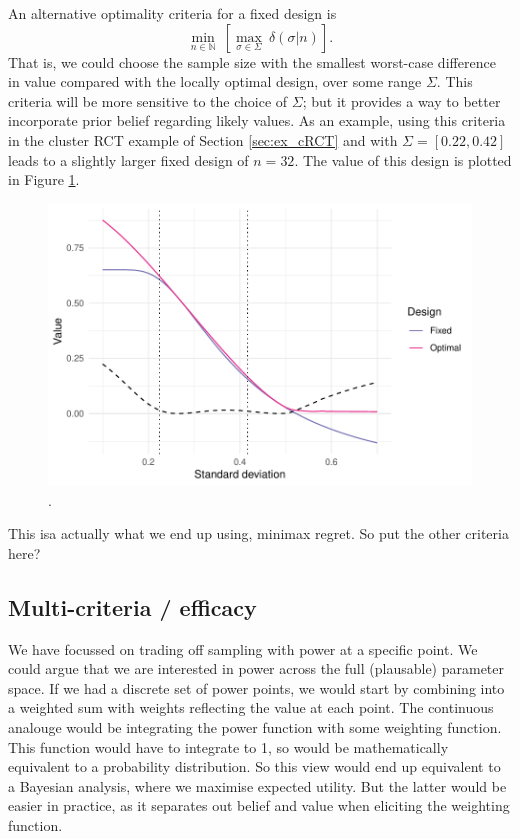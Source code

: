 \documentclass[sagev, Crown]{sagej}
\begin{document}
An alternative optimality criteria for a fixed design is
$$
\min_{n \in \mathbb{N}} ~ \left[ \max_{\sigma \in \Sigma} ~  \delta(\sigma | n) \right].
$$
That is, we could choose the sample size with the smallest worst-case difference in value compared with the locally optimal design, over some range $\Sigma$. This criteria will be more sensitive to the choice of $\Sigma$; but it provides a way to better incorporate prior belief regarding likely values. As an example, using this criteria in the cluster RCT example of Section \ref{sec:ex_cRCT} and with $\Sigma = [0.22, 0.42]$ leads to a slightly larger fixed design of $n = 32$. The value of this design is plotted in Figure \ref{fig:minimax_t_test}.

\begin{figure}
\centering
\includegraphics[scale=0.8]{./figures/minimax_t_test}
\caption{.}
\label{fig:minimax_t_test}
\end{figure}

This isa actually what we end up using, minimax regret. So put the other criteria here?

\subsection{Multi-criteria / efficacy}

We have focussed on trading off sampling with power at a specific point. We could argue that we are interested in power across the full (plausable) parameter space. If we had a discrete set of power points, we would start by combining into a weighted sum with weights reflecting the value at each point. The continuous analouge would be integrating the power function with some weighting function. This function would have to integrate to 1, so would be mathematically equivalent to a probability distribution. So this view would end up equivalent to a Bayesian analysis, where we maximise expected utility. But the latter would be easier in practice, as it separates out belief and value when eliciting the weighting function.
\end{document}
